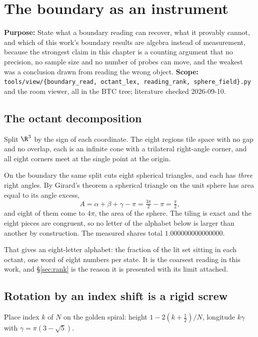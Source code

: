 \chapter{The boundary as an instrument}

\textbf{Purpose:} State what a boundary reading can recover, what it provably cannot, and which of this work's boundary results are algebra instead of measurement, because the strongest claim in this chapter is a counting argument that no precision, no sample size and no number of probes can move, and the weakest was a conclusion drawn from reading the wrong object. \textbf{Scope:} \texttt{tools/\allowbreak{}view/\allowbreak{}\{boundary\_read, octant\_lex, reading\_rank, sphere\_field\}.py} and the room viewer, all in the BTC tree; literature checked 2026-09-10.

\section{The octant decomposition}

Split \(\R^3\) by the sign of each coordinate. The eight regions tile space with no gap and no overlap, each is an infinite cone with a trilateral right-angle corner, and all eight corners meet at the single point at the origin.

On the boundary the same split cuts eight spherical triangles, and each has \emph{three} right angles. By Girard's theorem a spherical triangle on the unit sphere has area equal to its angle excess,
\[
  A = \alpha + \beta + \gamma - \pi = \tfrac{3\pi}{2} - \pi = \tfrac{\pi}{2},
\]
and eight of them come to \(4\pi\), the area of the sphere. The tiling is exact and the eight pieces are congruent, so no letter of the alphabet below is larger than another by construction. The measured shares total \(1.000000000000000\).

That gives an eight-letter alphabet: the fraction of the lit set sitting in each octant, one word of eight numbers per state. It is the coarsest reading in this work, and \S\ref{sec:rank} is the reason it is presented with its limit attached.

\section{Rotation by an index shift is a rigid screw}

Place index \(k\) of \(N\) on the golden spiral: height \(1 - 2(k + \tfrac12)/N\), longitude \(k\gamma\) with \(\gamma = \pi(3 - \sqrt5)\).

